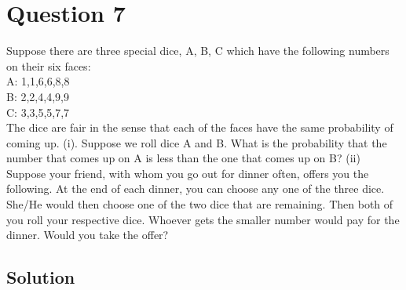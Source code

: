 \section*{Question 7}

Suppose there are three special dice, A, B, C which have the following numbers on their six faces:\\
A: 1,1,6,6,8,8\\
B: 2,2,4,4,9,9\\
C: 3,3,5,5,7,7\\

The dice are fair in the sense that each of the faces have the same probability of coming up.
(i). Suppose we roll dice A and B.
What is the probability that the number that comes up on A is less than the one that comes up on B?
(ii) Suppose your friend, with whom you go out for dinner often, offers you the following.
At the end of each dinner, you can choose any one of the three dice.
She/He would then choose one of the two dice that are remaining.
Then both of you roll your respective dice.
Whoever gets the smaller number would pay for the dinner.
Would you take the offer?

\subsection*{Solution}
